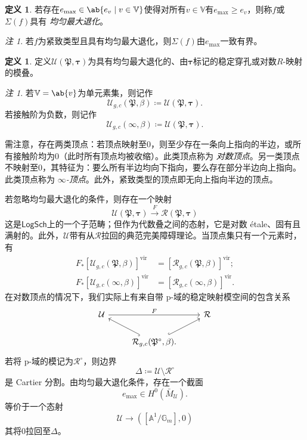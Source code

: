 \documentclass{amsart}
\theoremstyle{definition}
\newtheorem{defn}[thm]{定义}
\theoremstyle{remark}
\newtheorem{rmk}[thm]{注}
\theoremstyle{plain}
\theoremstyle{definition}
\theoremstyle{remark}
\newcommand{\A}{\mathbb{A}}
\newcommand{\G}{\mathbb{G}}
\newcommand{\V}{\mathbb{V}}
\newcommand{\mc}[1]{\mathcal{#1}}
\newcommand{\mf}[1]{\mathfrak{#1}}
\newcommand{\mr}[1]{\mathrm{#1}}
\newcommand{\ms}[1]{\mathsf{#1}}
\newcommand{\1}{\mathbf{1}}
\newcommand{\2}{\mathbf{2}}
\newcommand{\3}{\mathbf{3}}
\newcommand{\vir}{\mr{vir}}
\begin{document}
\begin{defn}
若存在\(e_{\max} \in \ab\{e_v \mid v \in \V \}\)使得对所有\(v \in \V\)有\(e_{\max} \geq e_v\)，则称\(f\)或\(\Sigma(f)\)具有 \textit{均匀最大退化}。
\end{defn}

\begin{rmk}
若\(f\)为紧致类型且具有均匀最大退化，则\(\Sigma(f)\)由\(e_{\max}\)一致有界。
\end{rmk}

\begin{defn}
定义\(\mc{U}(\mf{P}, \bm{\tau})\)为具有均匀最大退化的、由\(\bm{\tau}\)标记的稳定穿孔或对数\(R\)-映射的模叠。
\end{defn}

\begin{rmk}
若\(\V = \ab\{v\}\)为单元素集，则记作
    \[ \mc{U}_{g, c}(\mf{P}, \beta) \coloneqq \mc{U}(\mf{P}, \bm{\tau}). \]
若接触阶为负数，则记作
    \[ \mc{U}_{g, c}(\infty, \beta) \coloneqq \mc{U}(\mf{P}, \bm{\tau}). \]
\end{rmk}

需注意，存在两类顶点：若顶点映射至\(0\)，则至少存在一条向上指向的半边，或所有接触阶均为\(0\)（此时所有顶点均被收缩）。此类顶点称为 \textit{对数顶点}。另一类顶点不映射至\(0\)，其特征为：要么所有半边均向下指向，要么存在部分半边向上指向。此类顶点称为 \textit{\(\infty\)-顶点}。此外，紧致类型的顶点即无向上指向半边的顶点。

若忽略均匀最大退化的条件，则存在一个映射
\[ \mc{U}(\mf{P}, \bm{\tau}) \xrightarrow{F} \mc{R}(\mf{P}, \bm{\tau}) \]
这是\(\ms{LogSch}\)上的一个子范畴；但作为代数叠之间的态射，它是对数 \'etale、固有且满射的。此外，\(\mc{U}\)带有从\(\mc{R}\)拉回的典范完美障碍理论。当顶点集只有一个元素时，有
\begin{align*}
    F_* [\mc{U}_{g, c}(\mf{P}, \beta)]^{\vir} &= [\mc{R}_{g, c}(\mf{P}, \beta)]^{\vir}; \\
    F_* [\mc{U}_{g, c}(\infty, \beta)]^{\vir} &= [\mc{R}_{g, c}(\infty, \beta)]^{\vir}.
\end{align*}
在对数顶点的情况下，我们实际上有来自带 p-域的稳定映射模空间的包含关系
\begin{equation*}
\begin{tikzcd}
    \mc{U} \ar{rr}{F} & & \mc{R} \\
    & \mc{R}_{g,c}(\mf{P}^{\circ}, \beta) \ar[hookrightarrow]{ul} \ar[hookrightarrow]{ur}.
\end{tikzcd}
\end{equation*}
若将 p-域的模记为\(\mc{R}^{\circ}\)，则边界
\[ \Delta \coloneqq \mc{U} \setminus \mc{R}^{\circ} \]
是 Cartier 分割。由均匀最大退化条件，存在一个截面
\[ e_{\max} \in H^0(\bar{M}_{\mc{U}}). \]
等价于一个态射
\[ \mc{U} \to ([\A^1/\G_m], 0) \]
其将\(0\)拉回至\(\Delta\)。
\end{document}
